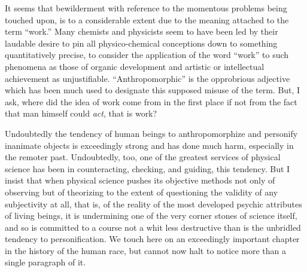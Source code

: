 \documentclass[a4paper, 11pt, oneside, polutonikogreek, english, landscape]{article}
\begin{document}
It seems that bewilderment with reference to the momentous problems being touched upon, is to a considerable extent due to the meaning attached to the term ``work.'' Many chemists and physicists seem to have been led by their laudable desire to pin all physico-chemical conceptions down to something quantitatively precise, to consider the application of the word ``work'' to such phenomena as those of organic development and artistic or intellectual achievement as unjustifiable. ``Anthropomorphic'' is the opprobrious adjective which has been much used to designate this supposed misuse of the term. But, I ask, where did the idea of work come from in the first place if not from the fact that man himself could \emph{act}, that is work?

Undoubtedly the tendency of human beings to anthropomorphize and personify inanimate objects is exceedingly strong and has done much harm, especially in the remoter past. Undoubtedly, too, one of the greatest services of physical science has been in counteracting, checking, and guiding, this tendency. But I insist that when physical science pushes its objective methods not only of observing but of theorizing to the extent of questioning the validity of any subjectivity at all, that is, of the reality of the most developed psychic attributes of living beings, it is undermining one of the very corner stones of science itself, and so is committed to a course not a whit less destructive than is the unbridled tendency to personification. We touch here on an exceedingly important chapter in the history of the human race, but cannot now halt to notice more than a single paragraph of it.
\end{document}
